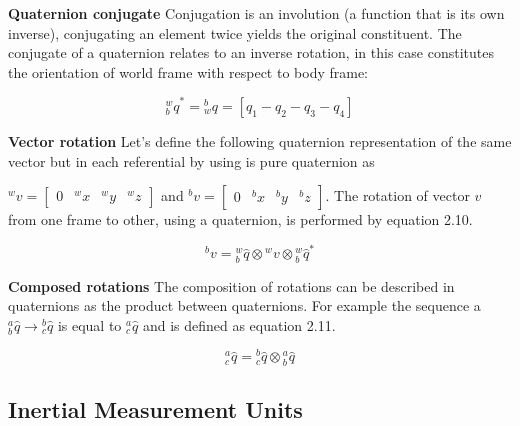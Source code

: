\item \textbf{Quaternion conjugate} Conjugation is an involution (a function that is its own inverse), conjugating an element twice yields the original constituent. The conjugate of a quaternion relates to an inverse rotation, in this case constitutes the orientation of world frame with respect to body frame:

\begin{equation}
    \textrm{$_{b}^{w}q$}^* =\textrm{$_{w}^{b}q$} = \left[q_1 - q_2 - q_3 - q_4\right]
\end{equation}

\item \textbf{Vector rotation} Let's define the following quaternion representation of the same vector but in each referential by using is pure quaternion as

$ ^wv = \begin{bmatrix}
        0 & ^wx & ^wy & ^wz
    \end{bmatrix} $
and
$^bv = \begin{bmatrix}
        0 & ^bx & ^by & ^bz
    \end{bmatrix} $. The rotation of vector $v$ from one frame to other, using a quaternion, is performed by equation 2.10.

\begin{equation}
    \textrm{$^{b}v$} = \textrm{$_{b}^{w}\hat{q}$} \otimes \textrm{$^{w}v$} \otimes \textrm{$_{b}^{w}\hat{q}$}^*
\end{equation}

\item \textbf{Composed rotations} The composition of rotations can be described in quaternions as the product between quaternions. For example the sequence a $^a_b\hat{q} \rightarrow {^b_c\hat{q}}$ is equal to $^a_c{\hat{q}}$ and is defined as equation 2.11.


\begin{equation}
    \textrm{$_{c}^{a}\hat{q}$} = \textrm{$_{c}^{b}\hat{q}$} \otimes \textrm{$_{b}^{a}\hat{q}$}
\end{equation}

\subsection{Inertial Measurement Units}

